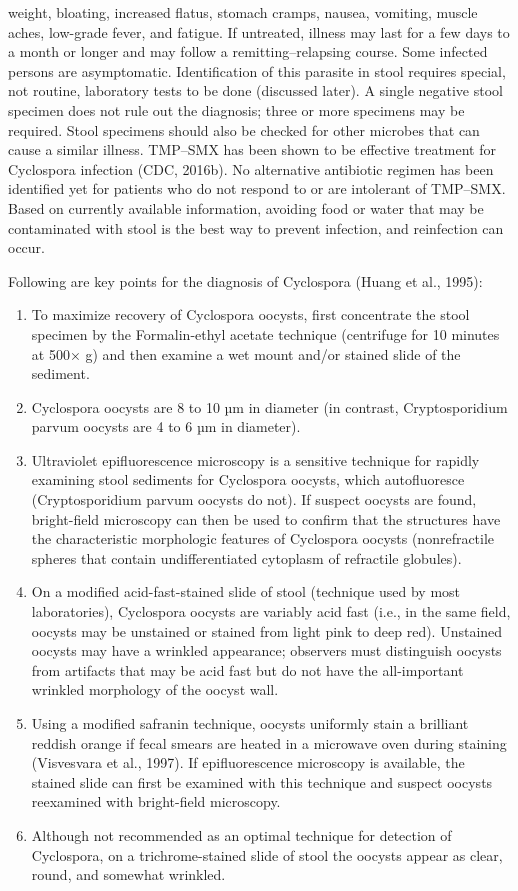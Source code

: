 \documentclass{article}
\begin{document}
weight, bloating, increased flatus, stomach cramps, nausea, vomiting,
muscle aches, low-grade fever, and fatigue. If untreated, illness may
last for a few days to a month or longer and may follow a
remitting--relapsing course. Some infected persons are asymptomatic.
Identification of this parasite in stool requires special, not routine,
laboratory tests to be done (discussed later). A single negative stool
specimen does not rule out the diagnosis; three or more specimens may be
required. Stool specimens should also be checked for other microbes that
can cause a similar illness. TMP--SMX has been shown to be effective
treatment for Cyclospora infection (CDC, 2016b). No alternative
antibiotic regimen has been identified yet for patients who do not
respond to or are intolerant of TMP--SMX. Based on currently available
information, avoiding food or water that may be contaminated with stool
is the best way to prevent infection, and reinfection can occur.

Following are key points for the diagnosis of Cyclospora (Huang et al.,
1995):

\begin{enumerate}
\def\labelenumi{\arabic{enumi}.}
\tightlist
\item
  To maximize recovery of Cyclospora oocysts, first concentrate the
  stool specimen by the Formalin-ethyl acetate technique (centrifuge for
  10 minutes at 500× g) and then examine a wet mount and/or stained
  slide of the sediment.
\item
  Cyclospora oocysts are 8 to 10 µm in diameter (in contrast,
  Cryptosporidium parvum oocysts are 4 to 6 µm in diameter).
\item
  Ultraviolet epifluorescence microscopy is a sensitive technique for
  rapidly examining stool sediments for Cyclospora oocysts, which
  autofluoresce (Cryptosporidium parvum oocysts do not). If suspect
  oocysts are found, bright-field microscopy can then be used to confirm
  that the structures have the characteristic morphologic features of
  Cyclospora oocysts (nonrefractile spheres that contain
  undifferentiated cytoplasm of refractile globules).
\item
  On a modified acid-fast-stained slide of stool (technique used by most
  laboratories), Cyclospora oocysts are variably acid fast (i.e., in the
  same field, oocysts may be unstained or stained from light pink to
  deep red). Unstained oocysts may have a wrinkled appearance; observers
  must distinguish oocysts from artifacts that may be acid fast but do
  not have the all-important wrinkled morphology of the oocyst wall.
\item
  Using a modified safranin technique, oocysts uniformly stain a
  brilliant reddish orange if fecal smears are heated in a microwave
  oven during staining (Visvesvara et al., 1997). If epifluorescence
  microscopy is available, the stained slide can first be examined with
  this technique and suspect oocysts reexamined with bright-field
  microscopy.
\item
  Although not recommended as an optimal technique for detection of
  Cyclospora, on a trichrome-stained slide of stool the oocysts appear
  as clear, round, and somewhat wrinkled.
\end{enumerate}
\end{document}
